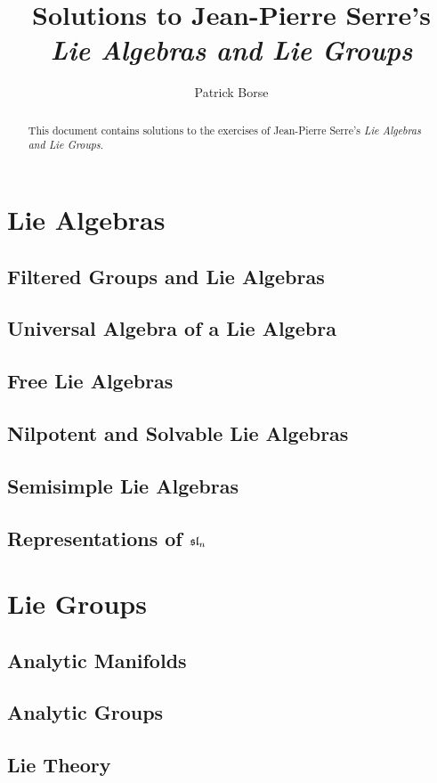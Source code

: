 \documentclass[oneside]{amsbook}
\title{Solutions to Jean-Pierre Serre's\\ \emph{Lie Algebras and Lie Groups}}
\author{Patrick Borse}
\begin{document}
\begin{abstract}
This document contains solutions to the exercises of Jean-Pierre Serre's \emph{Lie Algebras and Lie Groups}.
\end{abstract}

\maketitle

\tableofcontents

\part{Lie Algebras}
\setcounter{chapter}{1}
\chapter{Filtered Groups and Lie Algebras}


\chapter{Universal Algebra of a Lie Algebra}


\chapter{Free Lie Algebras}


\chapter{Nilpotent and Solvable Lie Algebras}


\chapter{Semisimple Lie Algebras}


\chapter{Representations of $\sl_n$}


\part{Lie Groups}
\setcounter{chapter}{2}
\chapter{Analytic Manifolds}


\chapter{Analytic Groups}


\chapter{Lie Theory}

\end{document}
